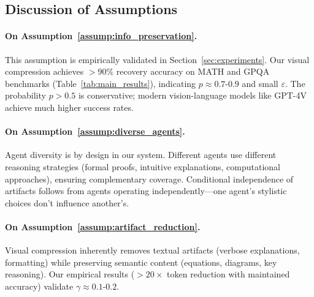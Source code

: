 \documentclass{article}
\theoremstyle{plain}
\theoremstyle{definition}
\theoremstyle{remark}
\begin{document}
\subsection{Discussion of Assumptions}

\paragraph{On Assumption~\ref{assump:info_preservation}.}
This assumption is empirically validated in Section~\ref{sec:experiments}. Our visual compression achieves $>90\%$ recovery accuracy on MATH and GPQA benchmarks (Table~\ref{tab:main_results}), indicating $p \approx 0.7$-$0.9$ and small $\varepsilon$. The probability $p > 0.5$ is conservative; modern vision-language models like GPT-4V achieve much higher success rates.

\paragraph{On Assumption~\ref{assump:diverse_agents}.}
Agent diversity is by design in our system. Different agents use different reasoning strategies (formal proofs, intuitive explanations, computational approaches), ensuring complementary coverage. Conditional independence of artifacts follows from agents operating independently—one agent's stylistic choices don't influence another's.

\paragraph{On Assumption~\ref{assump:artifact_reduction}.}
Visual compression inherently removes textual artifacts (verbose explanations, formatting) while preserving semantic content (equations, diagrams, key reasoning). Our empirical results ($>20\times$ token reduction with maintained accuracy) validate $\gamma \approx 0.1$-$0.2$.


\end{document}
